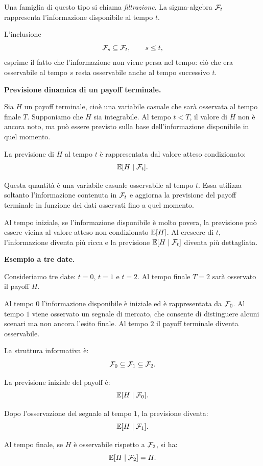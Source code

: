 Una famiglia di questo tipo si chiama \textit{filtrazione}. La sigma-algebra
$\mathcal{F}_t$ rappresenta l'informazione disponibile al tempo $t$.

L'inclusione
\[
\mathcal{F}_s\subseteq\mathcal{F}_t,
\qquad
s\leq t,
\]
esprime il fatto che l'informazione non viene persa nel tempo: ci\`{o} che era
osservabile al tempo $s$ resta osservabile anche al tempo successivo $t$.

\medskip

\noindent
\textbf{Previsione dinamica di un payoff terminale.}

Sia $H$ un payoff terminale, cio\`{e} una variabile casuale che sar\`{a}
osservata al tempo finale $T$. Supponiamo che $H$ sia integrabile. Al tempo
$t<T$, il valore di $H$ non \`{e} ancora noto, ma pu\`{o} essere previsto sulla
base dell'informazione disponibile in quel momento.

La previsione di $H$ al tempo $t$ \`{e} rappresentata dal valore atteso
condizionato:
\[
\mathbb{E}[H\mid\mathcal{F}_t].
\]

Questa quantit\`{a} \`{e} una variabile casuale osservabile al tempo $t$.
Essa utilizza soltanto l'informazione contenuta in $\mathcal{F}_t$ e aggiorna
la previsione del payoff terminale in funzione dei dati osservati fino a quel
momento.

Al tempo iniziale, se l'informazione disponibile \`{e} molto povera, la
previsione pu\`{o} essere vicina al valore atteso non condizionato
$\mathbb{E}[H]$. Al crescere di $t$, l'informazione diventa pi\`{u} ricca e la
previsione $\mathbb{E}[H\mid\mathcal{F}_t]$ diventa pi\`{u} dettagliata.

\medskip

\noindent
\textbf{Esempio a tre date.}

Consideriamo tre date: $t=0$, $t=1$ e $t=2$. Al tempo finale $T=2$ sar\`{a}
osservato il payoff $H$.

Al tempo $0$ l'informazione disponibile \`{e} iniziale ed \`{e} rappresentata
da $\mathcal{F}_0$. Al tempo $1$ viene osservato un segnale di mercato, che
consente di distinguere alcuni scenari ma non ancora l'esito finale. Al tempo
$2$ il payoff terminale diventa osservabile.

La struttura informativa \`{e}:
\[
\mathcal{F}_0
\subseteq
\mathcal{F}_1
\subseteq
\mathcal{F}_2.
\]

La previsione iniziale del payoff \`{e}:
\[
\mathbb{E}[H\mid\mathcal{F}_0].
\]

Dopo l'osservazione del segnale al tempo $1$, la previsione diventa:
\[
\mathbb{E}[H\mid\mathcal{F}_1].
\]

Al tempo finale, se $H$ \`{e} osservabile rispetto a $\mathcal{F}_2$, si ha:
\[
\mathbb{E}[H\mid\mathcal{F}_2]
=
H.
\]

